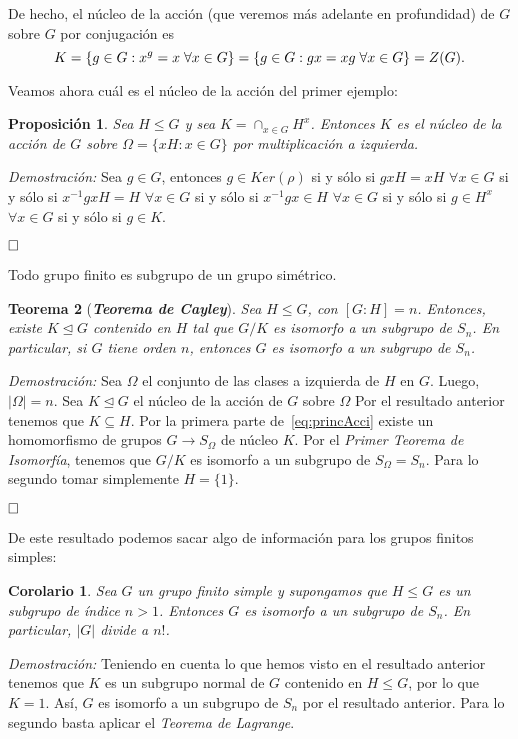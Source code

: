 \documentclass[12pt]{article}
\newtheorem{theorem}{Teorema}[section]
\newtheorem{proposition}[theorem]{Proposición}
\newtheorem{corolario}{Corolario}[theorem]
\begin{document}
De hecho, el núcleo de la acción (que veremos más adelante en profundidad) de $G$ sobre $G$ por conjugación es $$K = \lbrace g \in G : x^g =x \hspace{0.1cm} \forall x \in G \rbrace = \lbrace g \in G:gx=xg \hspace{0.1cm} \forall x \in G \rbrace = Z(G).$$

Veamos ahora cuál es el núcleo de la acción del primer ejemplo:

\begin{proposition}Sea $H \leq G$ y sea $K = \cap_{x \in G} H^x$. Entonces $K$ es el núcleo de la acción de $G$ sobre $\Omega = \lbrace xH :x \in G \rbrace$ por multiplicación a izquierda.
\end{proposition}
\emph{Demostración: }Sea $g \in G$, entonces $g \in Ker (\rho)$ si y sólo si $gxH = xH$ $\forall x \in G$ si y sólo si $x^{-1}gx H = H$  $\forall x \in G$ si y sólo si $x^{-1}gx \in H$ $\forall x \in G$ si y sólo si $g \in H^x$ $\forall x \in G$ si y sólo si $g \in K$.

$\hfill \square$

Todo grupo finito es subgrupo de un grupo simétrico.

\begin{theorem}[\textbf{\textit{Teorema de Cayley}}]
Sea $H \leq G$, con $[G:H] = n$. Entonces, existe $K \unlhd G$ contenido en $H$ tal que $G/K$ es isomorfo a un subgrupo de $S_n$. En particular, si $G$ tiene orden $n$, entonces $G$ es isomorfo a un subgrupo de $S_n$.
\end{theorem}
\emph{Demostración: }Sea $\Omega$ el conjunto de las clases a izquierda de $H$ en $G$. Luego, $|\Omega | = n$. Sea $K \unlhd G$ el núcleo de la acción de $G$ sobre $\Omega$ Por el resultado anterior tenemos que $K \subseteq H$. Por la primera parte de~\ref{eq:princAcci} existe un homomorfismo de grupos $G \longrightarrow S_{\Omega}$ de núcleo $K$. Por el \textit{Primer Teorema de Isomorfía}, tenemos que $G/K$ es isomorfo a un subgrupo de $S_{\Omega} = S_n$. Para lo segundo tomar simplemente $H = \lbrace 1 \rbrace$.

$\hfill \square$

De este resultado podemos sacar algo de información para los grupos finitos simples:

\begin{corolario}Sea $G$ un grupo finito simple y supongamos que $H \leq G$ es un subgrupo de índice $n > 1$. Entonces $G$ es isomorfo a un subgrupo de $S_n$. En particular, $|G|$ divide a $n!$.
\end{corolario}
\emph{Demostración: }Teniendo en cuenta lo que hemos visto en el resultado anterior tenemos que $K$ es un subgrupo normal de $G$ contenido en $H\leq G$, por lo que $K = 1$. Así, $G$ es isomorfo a un subgrupo de $S_n$ por el resultado anterior. Para lo segundo basta aplicar el \textit{Teorema de Lagrange}.
\end{document}
